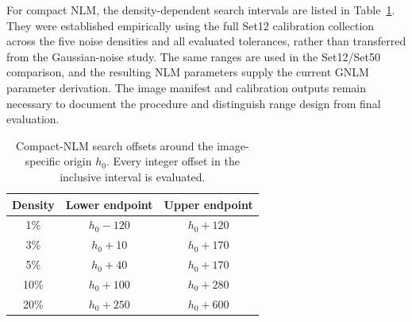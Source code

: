 \documentclass[pdflatex,iicol,sn-mathphys-num]{sn-jnl}
\newif\ifshowportuguese
\newcommand{\pt}[1]{\ifshowportuguese\par\begingroup\small\color{blue!55!black}\noindent\textbf{PT: }#1\par\endgroup\fi}
\begin{document}
For compact NLM, the density-dependent search intervals are listed in Table~\ref{tab:nlm_calibration_ranges}. They were established empirically using the full Set12 calibration collection across the five noise densities and all evaluated tolerances, rather than transferred from the Gaussian-noise study. The same ranges are used in the Set12/Set50 comparison, and the resulting NLM parameters supply the current GNLM parameter derivation. The image manifest and calibration outputs remain necessary to document the procedure and distinguish range design from final evaluation.
\pt{Para o NLM compacto, os intervalos de busca específicos por densidade estão na Tabela~\ref{tab:nlm_calibration_ranges}. Eles foram estabelecidos empiricamente usando a coleção completa de calibração Set12 nas cinco densidades de ruído e em todas as tolerâncias avaliadas, em vez de serem transferidos do estudo com ruído Gaussiano. As mesmas faixas são usadas na comparação Set12/Set50, e os parâmetros NLM resultantes fornecem a base para a derivação atual do parâmetro GNLM. O manifesto das imagens e as saídas de calibração continuam necessários para documentar o procedimento e distinguir a definição das faixas da avaliação final.}

\begin{table}[!t]
  \centering
  \caption{Compact-NLM search offsets around the image-specific origin $h_0$. Every integer offset in the inclusive interval is evaluated.}
  \label{tab:nlm_calibration_ranges}
  \begin{tabular}{ccc}
  \toprule
  Density & Lower endpoint & Upper endpoint \\
  \midrule
  1\% & $h_0-120$ & $h_0+120$ \\
  3\% & $h_0+10$ & $h_0+170$ \\
  5\% & $h_0+40$ & $h_0+170$ \\
  10\% & $h_0+100$ & $h_0+280$ \\
  20\% & $h_0+250$ & $h_0+600$ \\
  \bottomrule
  \end{tabular}
  \pt{Deslocamentos de busca do NLM compacto em torno da origem específica da imagem $h_0$. Todo deslocamento inteiro no intervalo inclusivo é avaliado.}
\end{table}
\end{document}
